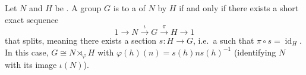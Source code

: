 \begin{theorem} \label{theorem:group_is_semidirect_product_of_groups_if_and_only_if_there_is_a_split_short_exact_sequence}
Let $N$ and $H$ be .
A group $G$ is  to a  of $N$ by $H$ if and only if there exists a short exact sequence
$$ 1 \longrightarrow N \xrightarrow{\iota} G \xrightarrow{\pi} H \longrightarrow 1 $$
that splits, meaning there exists a section $s: H \to G$, i.e.~a  such that $\pi \circ s = \operatorname{id}_H$. In this case, $G \cong N \rtimes_\varphi H$ with $\varphi(h)(n) = s(h)n s(h)^{-1}$ (identifying $N$ with its image $\iota(N)$).
\end{theorem}
